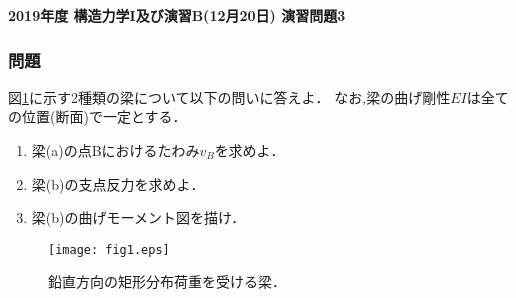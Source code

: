 \documentclass[10pt,a4j]{jarticle}
\newlength{\minitwocolumn}
\begin{document}
\newcommand{\fat}[1]{\mbox{\boldmath $#1$}}
\newcommand{\D}{\partial}
\newcommand{\w}{\omega}
\newcommand{\ga}{\alpha}
\newcommand{\gb}{\beta}
\newcommand{\gx}{\xi}
\newcommand{\gz}{\zeta}
\newcommand{\vhat}[1]{\hat{\fat{#1}}}
\newcommand{\spc}{\vspace{0.7\baselineskip}}
\newcommand{\halfspc}{\vspace{0.3\baselineskip}}

\pagestyle{empty}
\newcommand{\twofig}[2]
 {
   \begin{figure}[h]
     \begin{minipage}[t]{\minitwocolumn}
         \begin{center}   #1
         \end{center}
     \end{minipage}
         \hspace{\columnsep}
     \begin{minipage}[t]{\minitwocolumn}
         \begin{center} #2
         \end{center}
     \end{minipage}
   \end{figure}
 }
\begin{center}
{\Large \bf 2019年度 構造力学I及び演習B(12月20日) 演習問題3} \\
\end{center}
\subsubsection*{問題}
図\ref{fig:fig1}に示す2種類の梁について以下の問いに答えよ．
なお,梁の曲げ剛性$EI$は全ての位置(断面)で一定とする．
\begin{enumerate}
\item
	梁(a)の点Bにおけるたわみ$v_B$を求めよ．
\item
    	梁(b)の支点反力を求めよ．
\item
	梁(b)の曲げモーメント図を描け．
\end{enumerate}
\begin{figure}[h]
	\begin{center}
	\texttt{[image: fig1.eps]} 
	\end{center}
	\caption{鉛直方向の矩形分布荷重を受ける梁．}
	\label{fig:fig1}
\end{figure}
\end{document}
